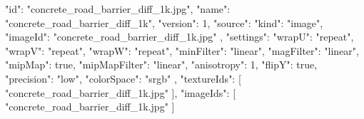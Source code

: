 {
  "id": "concrete_road_barrier_diff_1k.jpg",
  "name": "concrete_road_barrier_diff_1k",
  "version": 1,
  "source": {
    "kind": "image",
    "imageId": "concrete_road_barrier_diff_1k.jpg"
  },
  "settings": {
    "wrapU": "repeat",
    "wrapV": "repeat",
    "wrapW": "repeat",
    "minFilter": "linear",
    "magFilter": "linear",
    "mipMap": true,
    "mipMapFilter": "linear",
    "anisotropy": 1,
    "flipY": true,
    "precision": "low",
    "colorSpace": "srgb"
  },
  "textureIds": [
    "concrete_road_barrier_diff_1k.jpg"
  ],
  "imageIds": [
    "concrete_road_barrier_diff_1k.jpg"
  ]
}
